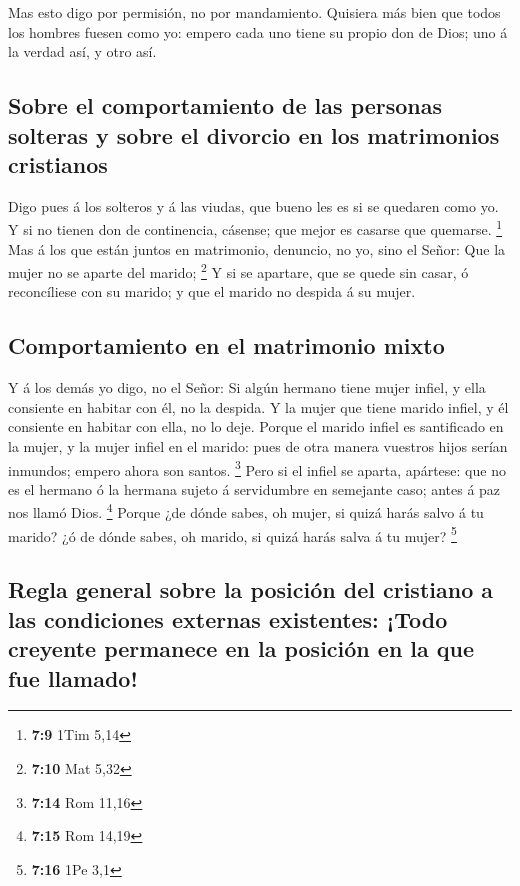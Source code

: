  Mas esto digo por permisión, no por mandamiento.
 Quisiera más bien que todos los hombres fuesen como yo:
empero cada uno tiene su propio don de Dios; uno á la verdad así, y otro
así.

\hypertarget{sobre-el-comportamiento-de-las-personas-solteras-y-sobre-el-divorcio-en-los-matrimonios-cristianos}{%
\subsection{Sobre el comportamiento de las personas solteras y sobre el
divorcio en los matrimonios
cristianos}\label{sobre-el-comportamiento-de-las-personas-solteras-y-sobre-el-divorcio-en-los-matrimonios-cristianos}}

 Digo pues á los solteros y á las viudas, que bueno les es
si se quedaren como yo.  Y si no tienen don de continencia,
cásense; que mejor es casarse que quemarse. \footnote{\textbf{7:9} 1Tim
  5,14}  Mas á los que están juntos en matrimonio,
denuncio, no yo, sino el Señor: Que la mujer no se aparte del marido;
\footnote{\textbf{7:10} Mat 5,32}  Y si se apartare, que se
quede sin casar, ó reconcíliese con su marido; y que el marido no
despida á su mujer.

\hypertarget{comportamiento-en-el-matrimonio-mixto}{%
\subsection{Comportamiento en el matrimonio
mixto}\label{comportamiento-en-el-matrimonio-mixto}}

 Y á los demás yo digo, no el Señor: Si algún hermano tiene
mujer infiel, y ella consiente en habitar con él, no la despida.
 Y la mujer que tiene marido infiel, y él consiente en
habitar con ella, no lo deje.  Porque el marido infiel es
santificado en la mujer, y la mujer infiel en el marido: pues de otra
manera vuestros hijos serían inmundos; empero ahora son santos.
\footnote{\textbf{7:14} Rom 11,16}  Pero si el infiel se
aparta, apártese: que no es el hermano ó la hermana sujeto á servidumbre
en semejante caso; antes á paz nos llamó Dios. \footnote{\textbf{7:15}
  Rom 14,19}  Porque ¿de dónde sabes, oh mujer, si quizá
harás salvo á tu marido? ¿ó de dónde sabes, oh marido, si quizá harás
salva á tu mujer? \footnote{\textbf{7:16} 1Pe 3,1}

\hypertarget{regla-general-sobre-la-posiciuxf3n-del-cristiano-a-las-condiciones-externas-existentes-todo-creyente-permanece-en-la-posiciuxf3n-en-la-que-fue-llamado}{%
\subsection{Regla general sobre la posición del cristiano a las
condiciones externas existentes: ¡Todo creyente permanece en la posición
en la que fue
llamado!}\label{regla-general-sobre-la-posiciuxf3n-del-cristiano-a-las-condiciones-externas-existentes-todo-creyente-permanece-en-la-posiciuxf3n-en-la-que-fue-llamado}}

